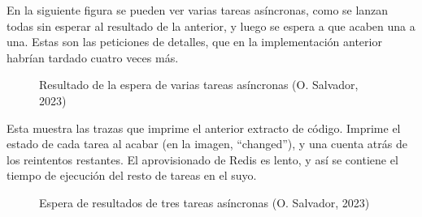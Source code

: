 \documentclass[11pt]{article}
\begin{document}
\begin{flushleft}
    En la siguiente figura se pueden ver varias tareas asíncronas, como se lanzan todas sin esperar al resultado de la anterior, y luego se espera a que acaben una a una. Estas son las peticiones de detalles, que en la implementación anterior habrían tardado cuatro veces más.
    \linebreak
    
        \begin{figure}[htb]
			\centering
			\caption{Resultado de la espera de varias tareas asíncronas (O. Salvador, 2023)}
		\end{figure}
    
    
    Esta muestra las trazas que imprime el anterior extracto de código. Imprime el estado de cada tarea al acabar (en la imagen, ``changed''), y una cuenta atrás de los reintentos restantes. El aprovisionado de Redis es lento, y así se contiene el tiempo de ejecución del resto de tareas en el suyo.
    \linebreak

        \begin{figure}[htb]
			\centering
			\caption{Espera de resultados de tres tareas asíncronas (O. Salvador, 2023)}
		\end{figure}


\end{flushleft}
\end{document}
